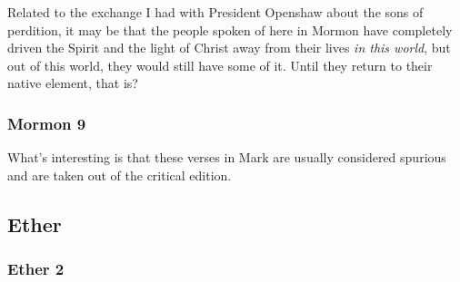 		\begin{compactdesc}
		
		\item[16$\vert$]
		\begin{compactdesc}
		\item[in the world] Related to the exchange I had with President Openshaw about the sons of perdition, it may be that the people spoken of here in Mormon have completely driven the Spirit and the light of Christ away from their lives \textit{in this world}, but out of this world, they would still have some of it. Until they return to their native element, that is?
		\end{compactdesc}
		
		\end{compactdesc}
		
	\subsubsection{Mormon 9} %
	
		\begin{compactdesc}
		
		\item[23--24$\vert$]
		\begin{compactdesc}
		\item[Quoting Mk 16:15--18] What's interesting is that these verses in Mark are usually considered spurious and are taken out of the critical edition.
		\end{compactdesc}
		
		\end{compactdesc}
		
\subsection{Ether} %

	\subsubsection{Ether 2} %
	
